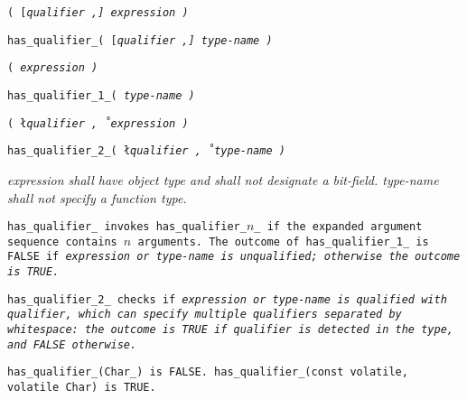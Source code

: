 
\s\s\s\tt{(} [\it{qualifier} \tt{,}]  \it{expression} \tt{)}

 \tt{has_qualifier_}\s\s\s\tt{(} [\it{qualifier} \tt{,}]  \it{type-name}  \tt{)}

\s\tt{(} \it{expression} \tt{)}

 \tt{has_qualifier_1_}\s\tt{(} \it{type-name}  \tt{)}

\s\tt{(} \l\it{qualifier} \tt{,}\r\ \it{expression} \tt{)}

 \tt{has_qualifier_2_}\s\tt{(} \l\it{qualifier} \tt{,}\r\ \it{type-name}  \tt{)}


\it{expression} shall have object type and shall not designate a bit-field.
\it{type-name}  shall not specify a function type.


\tt{has_qualifier_} invokes \tt{has_qualifier_}$n$\_ if
the expanded argument sequence contains $n$ arguments.
The outcome of \tt{has_qualifier_1_} is \tt{FALSE} if \it{expression}
or \it{type-name} is unqualified; otherwise the outcome is \tt{TRUE}.

\tt{has_qualifier_2_} checks if \it{expression} or \it{type-name} is qualified
with \it{qualifier}, which can specify multiple qualifiers separated by
whitespace: the outcome is \tt{TRUE} if \it{qualifier} is detected in the type,
and \tt{FALSE} otherwise.

\example \tt{has_qualifier_(Char_)} is \tt{FALSE}.
\tt{has_qualifier_(const volatile, volatile Char)} is \tt{TRUE}.

\pagebreak
